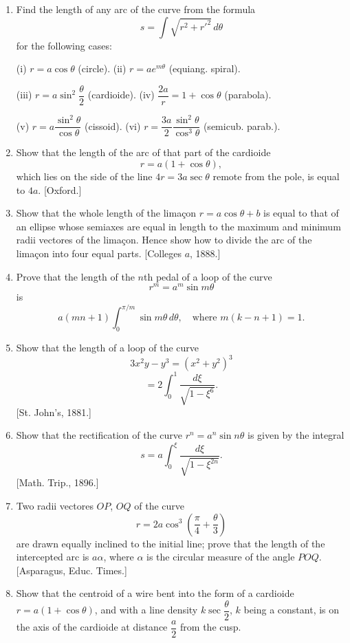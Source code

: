 \documentclass[11pt, a4paper]{article}
\newcommand{\source}[1]{\hfill\textnormal{[#1]}}
\begin{document}
\begin{enumerate}[leftmargin=2em]

\item Find the length of any arc of the curve from the formula
\[
s=\int\sqrt{r^2+r'^2}\,d\theta
\]
for the following cases:

(i) $r=a\cos\theta$ (circle).   (ii) $r=ae^{m\theta}$ (equiang. spiral).

(iii) $r=a\sin^2\dfrac{\theta}{2}$ (cardioide).   (iv) $\dfrac{2a}{r}=1+\cos\theta$ (parabola).

(v) $r=a\dfrac{\sin^2\theta}{\cos\theta}$ (cissoid).   (vi) $r=\dfrac{3a}{2}\dfrac{\sin^2\theta}{\cos^3\theta}$ (semicub. parab.).

\item Show that the length of the arc of that part of the cardioide
\[
r=a(1+\cos\theta),
\]
which lies on the side of the line $4r=3a\sec\theta$ remote from the pole, is equal to $4a$. \source{Oxford.}

\item Show that the whole length of the limaçon $r=a\cos\theta+b$ is equal to that of an ellipse whose semiaxes are equal in length to the maximum and minimum radii vectores of the limaçon. Hence show how to divide the arc of the limaçon into four equal parts. \source{Colleges $a$, 1888.}

\item Prove that the length of the $n$th pedal of a loop of the curve
\[
r^m=a^m\sin m\theta
\]
is
\[
a(mn+1)\int_0^{\pi/m}\sin m\theta\,d\theta,\quad\text{where }m(k-n+1)=1.
\]

\item Show that the length of a loop of the curve
\[
3x^2y-y^3=(x^2+y^2)^3
\]
\[
=2\int_0^1\frac{d\xi}{\sqrt{1-\xi^6}}.
\]
\source{St. John's, 1881.}

\item Show that the rectification of the curve $r^n=a^n\sin n\theta$ is given by the integral
\[
s=a\int_0^\xi\frac{d\xi}{\sqrt{1-\xi^{2n}}}.
\]
\source{Math. Trip., 1896.}

\item Two radii vectores $OP$, $OQ$ of the curve
\[
r=2a\cos^3\left(\frac{\pi}{4}+\frac{\theta}{3}\right)
\]
are drawn equally inclined to the initial line; prove that the length of the intercepted arc is $a\alpha$, where $\alpha$ is the circular measure of the angle $POQ$. \source{Asparagus, Educ. Times.}

\item Show that the centroid of a wire bent into the form of a cardioide $r=a(1+\cos\theta)$, and with a line density $k\sec\dfrac{\theta}{2}$, $k$ being a constant, is on the axis of the cardioide at distance $\dfrac{a}{2}$ from the cusp.

\end{enumerate}
\end{document}
